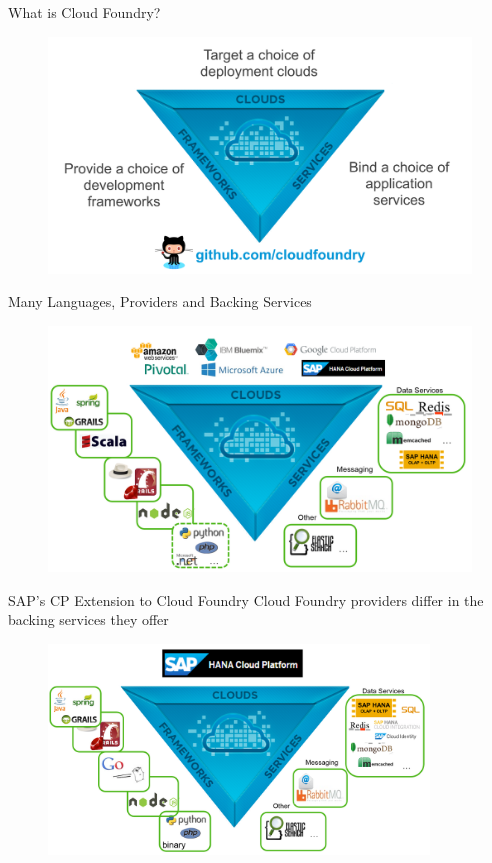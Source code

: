 \begin{frame}{What is Cloud Foundry?}
	\begin{figure}
  	\includegraphics[width=1.0\textwidth]{../CloudFoundryBasics//images/CF_Basics_2_CF_Intro1}
	\end{figure}
\end{frame}


\begin{frame}{Many Languages, Providers and Backing Services}
	\begin{figure}
  	\includegraphics[width=1.0\textwidth]{../CloudFoundryBasics//images/CF_Basics_3_CF_Intro2}
	\end{figure}
\end{frame}


\begin{frame}{SAP's CP Extension to Cloud Foundry}
Cloud Foundry providers differ in the backing services they offer
	\begin{figure}
  	\includegraphics[width=0.9\textwidth]{../CloudFoundryBasics//images/CF_Basics_3b}
	\end{figure}
\end{frame}


